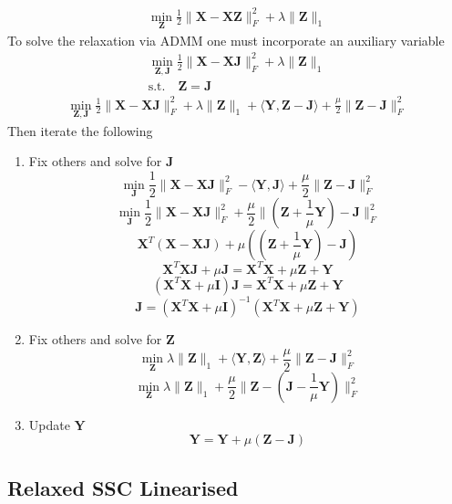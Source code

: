 \documentclass{article}
\begin{document}
\begin{align}
\min_{\mathbf Z} \frac12\|\mathbf X - \mathbf X\mathbf Z\|^2_F + \lambda\|\mathbf Z\|_{1}
\end{align}
To solve the relaxation via ADMM one must incorporate an auxiliary variable
\begin{align}
\min_{\mathbf{Z, J}} \frac12\|\mathbf X - \mathbf X\mathbf J\|^2_F + \lambda\|\mathbf Z\|_{1} \\
\text{s.t.} \quad \mathbf{Z = J} \nonumber
\end{align}
\begin{align}
\min_{\mathbf{Z, J}} \frac12\|\mathbf X - \mathbf X\mathbf J\|^2_F + \lambda\|\mathbf Z\|_{1} + \langle \mathbf{Y, Z - J} \rangle + \frac{\mu}{2} \| \mathbf{Z - J} \|_F^2
\end{align}
Then iterate the following
\begin{enumerate}
\item Fix others and solve for $\mathbf J$
\[
\min_{\mathbf J} \frac12\|\mathbf X - \mathbf X\mathbf J\|^2_F - \langle \mathbf{Y, J} \rangle + \frac{\mu}{2} \| \mathbf{Z - J} \|_F^2
\]
\[
\min_{\mathbf J} \frac12\|\mathbf X - \mathbf X\mathbf J\|^2_F + \frac{\mu}{2} \| (\mathbf Z + \frac{1}{\mu} \mathbf Y ) - \mathbf J \|_F^2
\]
\[
\mathbf X^T(\mathbf X - \mathbf X\mathbf J) + \mu ( (\mathbf Z + \frac{1}{\mu} \mathbf Y ) - \mathbf J )
\]
\[
\mathbf X^T\mathbf X\mathbf J  + \mu \mathbf J = \mathbf X^T\mathbf X + \mu \mathbf Z + \mathbf Y
\]
\[
(\mathbf X^T\mathbf X + \mu \mathbf I )\mathbf J = \mathbf X^T\mathbf X + \mu \mathbf Z + \mathbf Y
\]
\[
\mathbf J = (\mathbf X^T\mathbf X + \mu \mathbf I )^{-1} (\mathbf X^T\mathbf X + \mu \mathbf Z + \mathbf Y)
\]

\item Fix others and solve for $\mathbf Z$
\[
\min_{\mathbf Z} \lambda\|\mathbf Z\|_{1} + \langle \mathbf{Y, Z} \rangle + \frac{\mu}{2} \| \mathbf{Z - J} \|_F^2
\]
\[
\min_{\mathbf Z} \lambda\|\mathbf Z\|_{1} + \frac{\mu}{2} \| \mathbf Z - (\mathbf J - \frac{1}{\mu} \mathbf Y) \|_F^2
\]

\item Update $\mathbf Y$
\[
\mathbf Y = \mathbf Y + \mu (\mathbf{Z - J})
\]

\end{enumerate}

\subsection{Relaxed SSC Linearised}
\end{document}
